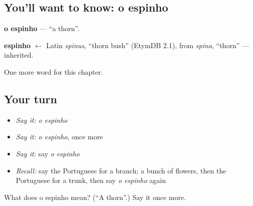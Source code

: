\subsection*{You'll want to know: o espinho}
\textbf{o espinho} — \textquotedblleft{}a thorn\textquotedblright{}.

\begin{cousinweb}
\textbf{espinho} $\leftarrow$ Latin \emph{spinus}, \textquotedblleft{}thorn bush\textquotedblright{} (EtymDB 2.1), from \emph{spina}, \textquotedblleft{}thorn\textquotedblright{} — inherited.
\end{cousinweb}

\begin{grammarlens}[title={What you've built}]
One more word for this chapter.
\end{grammarlens}

\subsection*{Your turn}
\begin{itemize}
\raggedright
  \item \emph{Say it:} \emph{o espinho}
  \item \emph{Say it:} \emph{o espinho}, once more
  \item \emph{Say it:} say \emph{o espinho}
  \item \emph{Recall:} say the Portuguese for a branch; a bunch of flowers, then the Portuguese for a trunk, then say \emph{o espinho} again
\end{itemize}

\begin{tcolorbox}[breakable,colback=teal!4,colframe=teal!35!black,title={Before you move on}]
What does o espinho mean? (\textquotedblleft{}A thorn\textquotedblright{}.) Say it once more.
\end{tcolorbox}
